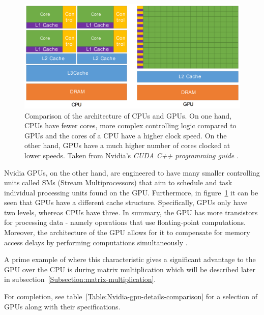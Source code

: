 \begin{figure}[h!]
	\centering
	\includegraphics[width=14cm, keepaspectratio]{images/ch1/nvidia_CPU_GPU_comparison.png}
	\caption{Comparison of the architecture of CPUs and GPUs. On one hand, CPUs have fewer cores, more complex controlling logic compared to GPUs and the cores of a CPU have a higher clock speed. On the other hand, GPUs have a much higher number of cores clocked at lower speeds. Taken from Nvidia's \emph{CUDA C++ programming guide} \cite{NVIDIAMay2022}.}
	\label{Figure:Nvidia-CPU-GPU-architecture-comparison}
\end{figure}

Nvidia GPUs, on the other hand, are engineered to have many smaller controlling units called SMs (Stream Multiprocessors) that aim to schedule and task individual processing units found on the GPU. Furthermore, in figure~\ref{Figure:Nvidia-CPU-GPU-architecture-comparison} it can be seen that GPUs have a different cache structure. Specifically, GPUs only have two levels, whereas CPUs have three. In summary, the GPU has more transistors for processing data - namely operations that use floating-point computations. Moreover, the architecture of the GPU allows for it to compensate for memory access delays by performing computations simultaneously \cite{NVIDIAMay2022}.
\par A prime example of where this characteristic gives a significant advantage to the GPU over the CPU is during matrix multiplication which will be described later in subsection~\ref{Subsection:matrix-multiplication}.

\par For completion, see table~\ref{Table:Nvidia-gpu-details-comparison} for a selection of GPUs along with their specifications.

